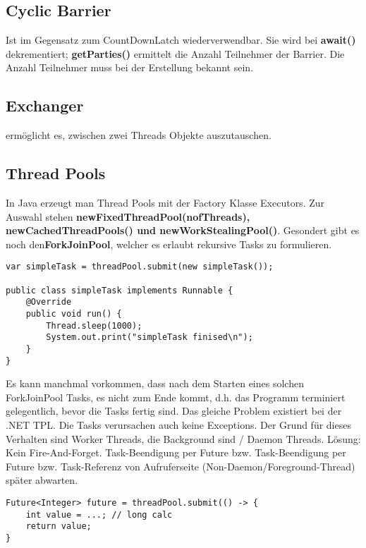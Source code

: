 \subsection{Cyclic Barrier}
Ist im Gegensatz zum CountDownLatch wiederverwendbar. Sie wird bei \textbf{await()} dekrementiert; \textbf{getParties()} ermittelt die Anzahl Teilnehmer der Barrier. Die Anzahl Teilnehmer muss bei der Erstellung bekannt sein.

\subsection{Exchanger}
ermöglicht es, zwischen zwei Threads Objekte auszutauschen.



\subsection{Thread Pools}
In Java erzeugt man Thread Pools mit der Factory Klasse Executors. Zur Auswahl stehen \textbf{newFixedThreadPool(nofThreads), newCachedThreadPools() und newWorkStealingPool()}. Gesondert gibt es noch den\textbf{ForkJoinPool}, welcher es erlaubt rekursive Tasks zu formulieren.



\begin{lstlisting}[style=Java]
var simpleTask = threadPool.submit(new simpleTask()); 

public class simpleTask implements Runnable {
	@Override
    public void run() {
    	Thread.sleep(1000);
    	System.out.print("simpleTask finised\n");
    }
}
\end{lstlisting}

Es kann manchmal vorkommen, dass nach dem Starten eines solchen ForkJoinPool Tasks, es nicht zum Ende kommt, d.h. das Programm terminiert gelegentlich, bevor die Tasks fertig sind. Das gleiche Problem existiert bei der .NET TPL. Die Tasks verursachen auch keine Exceptions. Der Grund für dieses Verhalten sind Worker Threads, die Background sind / Daemon Threads.
Lösung: Kein Fire-And-Forget. Task-Beendigung per Future bzw. Task-Beendigung per Future bzw. Task-Referenz von Aufruferseite (Non-Daemon/Foreground-Thread) später abwarten.

\begin{lstlisting}[style=Java]
Future<Integer> future = threadPool.submit(() -> {
	int value = ...; // long calc
	return value;
}
\end{lstlisting}

